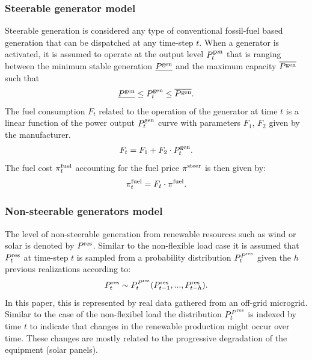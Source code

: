 \documentclass{article}
\begin{document}
\subsubsection{Steerable generator model}
    Steerable generation is considered any type of conventional fossil-fuel based generation that can be dispatched at any time-step $t$. When a generator is activated, it is assumed to operate at the output level $P^\text{gen}_t$ that is ranging between the minimum stable generation $\underline{P^\text{gen}}$ and the maximum capacity $\overline{P^\text{gen}}$ such that
    \begin{gather}
    \underline{P^\text{gen}} \leq P^\text{gen}_t \leq \overline{P^\text{gen}}.\label{eqn: generatordynamics}
    \end{gather}
    The fuel consumption $F_t$ related to the operation of the generator at time $t$ is a linear function of the power output $P^\text{gen}_t$ curve with parameters $F_1$, $F_2$ given by the manufacturer. 
    \begin{gather}
    F_t = F_1 + F_2 \cdot P^\text{gen}_t .\label{eqn: fuelconsuption}
    \end{gather}
    The fuel cost $\pi^{\text{fuel}}_t$ accounting for the fuel price $\pi^{\text{steer}}$ is then given by:
    \begin{gather}
    \pi^{\text{fuel}}_t = F_t \cdot \pi^{\text{fuel}} .\label{eqn: generatorcost}
    \end{gather}
    
\subsubsection{Non-steerable generators model}
    The level of non-steerable generation from renewable resources such as wind or solar is denoted by $P^\text{res}$. Similar to the non-flexible load case it is assumed that $P^\text{res}_t$ at time-step $t$ is sampled from a probability distribution $P^{P^\text{res}}_{t}$ given the $h$ previous realizations according to:
    \begin{gather}
    P^\text{res}_t \sim P^{P^\text{res}}_{t}( P^\text{res}_{t-1},...,P^\text{res}_{t-h}).\label{eqn: pv}
    \end{gather}
    In this paper, this is represented by real data gathered from an off-grid microgrid. Similar to the case of the non-flexibel load the distribution $P^{P^\text{res}}_{t}$ is indexed by time $t$ to indicate that changes in the renewable production might occur over time. These changes are mostly related to the progressive degradation of the equipment (solar panels).
    
\end{document}
